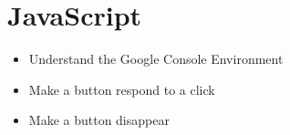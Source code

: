 \part{JavaScript}\label{part:javascript}

\begin{itemize}
    \item Understand the Google Console Environment
    \item Make a button respond to a click
    \item Make a button disappear
\end{itemize}
